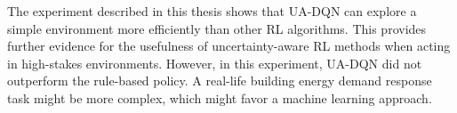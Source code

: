 The experiment described in this thesis shows that UA-DQN can explore a simple environment more efficiently than other RL algorithms.
This provides further evidence for the usefulness of uncertainty-aware RL methods when acting in high-stakes environments.
However, in this experiment, UA-DQN did not outperform the rule-based policy.
A real-life building energy demand response task might be more complex, which might favor a machine learning approach.

